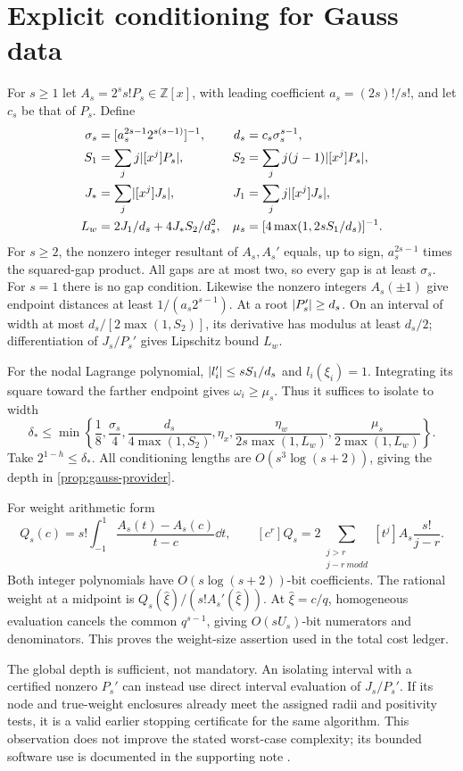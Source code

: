 \section{Explicit conditioning for Gauss data}
\label{app:gauss-conditioning}
For \(s\ge1\) let \(A_s=2^ss!P_s\in\mathbb Z[x]\), with leading
coefficient \(a_s=(2s)!/s!\), and let \(c_s\) be that of \(P_s\).
Define
\begin{align*}
 \sigma_s&=[a_s^{2s-1}2^{s(s-1)}]^{-1},&
 d_s&=c_s\sigma_s^{s-1},\\
 S_1&=\sum_jj\lvert [x^j]P_s\rvert,&
 S_2&=\sum_jj(j-1)\lvert [x^j]P_s\rvert,\\
 J_*&=\sum_j\lvert [x^j]J_s\rvert,&
 J_1&=\sum_jj\lvert [x^j]J_s\rvert,\\
 L_w&=2J_1/d_s+4J_*S_2/d_s^2,&
 \mu_s&=[4\max(1,2sS_1/d_s)]^{-1}.
\end{align*}
For \(s\ge2\), the nonzero integer resultant of \(A_s,A_s'\)
equals, up to sign, \(a_s^{2s-1}\) times the squared-gap product.
All gaps are at most two, so every gap is at least \(\sigma_s\).
For \(s=1\) there is no gap condition. Likewise the nonzero integers
\(A_s(\pm1)\) give endpoint distances at least
\(1/(a_s2^{s-1})\). At a root \(\lvert P_s'\rvert\ge d_s\).
On an interval of width at most \(d_s/[2\max(1,S_2)]\), its
derivative has modulus at least \(d_s/2\); differentiation of
\(J_s/P_s'\) gives Lipschitz bound \(L_w\).

For the nodal Lagrange polynomial,
\(\lvert l_i'\rvert\le sS_1/d_s\) and \(l_i(\xi_i)=1\).
Integrating its square toward the farther endpoint gives
\(\omega_i\ge\mu_s\). Thus it suffices to isolate to width
\begin{equation}
 \delta_*\le\min\left\{\frac18,\frac{\sigma_s}4,
 \frac{d_s}{4\max(1,S_2)},\eta_x,
 \frac{\eta_w}{2s\max(1,L_w)},
 \frac{\mu_s}{2\max(1,L_w)}\right\}.
 \label{eq:gauss-isolation-target}
\end{equation}
Take \(2^{1-h}\le\delta_*\). All conditioning lengths are
\(O(s^3\log(s+2))\), giving the depth in \cref{prop:gauss-provider}.

For weight arithmetic form
\[
 Q_s(c)=s!\int_{-1}^1\frac{A_s(t)-A_s(c)}{t-c}\dd t,
 \qquad
 [c^r]Q_s=2\sum_{\substack{j>r\\j-r\ {
m odd}}}
                   [t^j]A_s\frac{s!}{j-r}.
\]
Both integer polynomials have \(O(s\log(s+2))\)-bit coefficients.
The rational weight at a midpoint is
\(Q_s(\widehat\xi)/(s!A_s'(\widehat\xi))\).
At \(\widehat\xi=c/q\), homogeneous evaluation cancels the common
\(q^{s-1}\), giving \(O(sU_s)\)-bit numerators and denominators.
This proves the weight-size assertion used in the total cost ledger.

The global depth is sufficient, not mandatory. An isolating interval
with a certified nonzero \(P_s'\) can instead use direct interval
evaluation of \(J_s/P_s'\). If its node and true-weight enclosures
already meet the assigned radii and positivity tests, it is a valid
earlier stopping certificate for the same algorithm. This observation
does not improve the stated worst-case complexity; its bounded software
use is documented in the supporting note \cite{rec12}.
